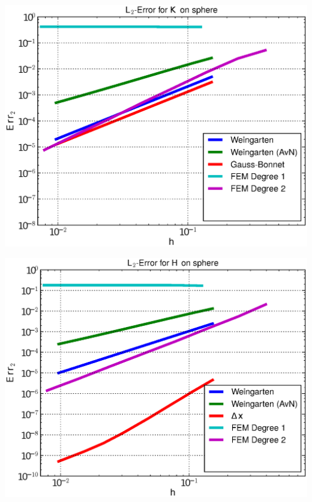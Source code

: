 \documentclass{beamer}
\begin{document}
\begin{frame}
\begin{overprint}
\begin{minipage}[t]{0.49\textwidth}
            \centering\includegraphics[width=\textwidth]{bilder/Curvature/sphere/ErrKL2_5.eps}
          \end{minipage}\hfill
          \begin{minipage}[t]{0.49\textwidth}
            \centering\includegraphics[width=\textwidth]{bilder/Curvature/sphere/ErrHL2_5.eps}
          \end{minipage}
          \begin{minipage}[t]{0.49\textwidth}

\end{minipage}
\end{overprint}
\end{frame}
\end{document}
